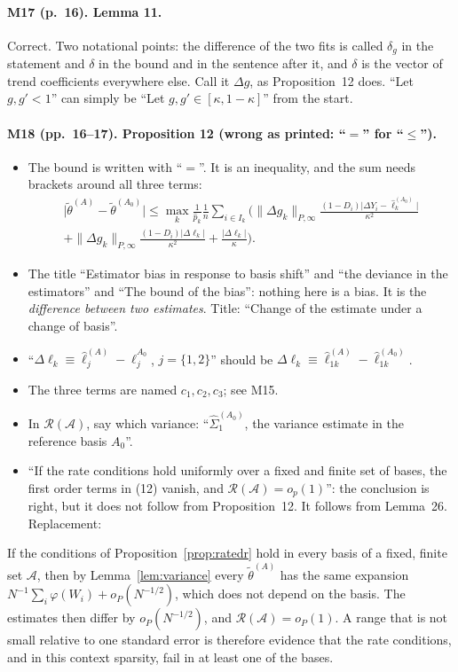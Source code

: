 \documentclass[11pt]{article}
\newenvironment{ins}{\begin{leftbar}}{\end{leftbar}}
\theoremstyle{plain}
\theoremstyle{remark}
\begin{document}
\paragraph{M17 (p.~16). Lemma 11.} Correct. Two notational points: the
difference of the two fits is called $\delta_g$ in the statement and $\delta$ in
the bound and in the sentence after it, and $\delta$ is the vector of trend
coefficients everywhere else. Call it $\Delta g$, as Proposition~12 does. ``Let
$g,g'<1$'' can simply be ``Let $g,g'\in[\kappa,1-\kappa]$'' from the start.

\paragraph{M18 (pp.~16--17). Proposition 12 (wrong as printed: ``$=$'' for ``$\le$'').}
\begin{itemize}
\item The bound is written with ``$=$''. It is an inequality, and the sum needs
  brackets around all three terms:
  \begin{multline*}
  \big|\tilde\theta^{(A)}-\tilde\theta^{(A_0)}\big|\le\max_k\frac1{\hat p_k}\frac1n\sum_{i\in I_k}
  \bigg(\|\Delta g_k\|_{P,\infty}\frac{(1-D_i)\big|\Delta Y_i-\hat\ell_k^{(A_0)}\big|}{\kappa^2}\\
  +\|\Delta g_k\|_{P,\infty}\frac{(1-D_i)|\Delta\ell_k|}{\kappa^2}+\frac{|\Delta\ell_k|}{\kappa}\bigg).
  \end{multline*}
\item The title ``Estimator bias in response to basis shift'' and ``the
  deviance in the estimators'' and ``The bound of the bias'': nothing here is a
  bias. It is the \emph{difference between two estimates}. Title: ``Change of the
  estimate under a change of basis''.
\item ``$\Delta\ell_k\equiv\hat\ell_j^{(A)}-\hat\ell_j^{A_0}$, $j=\{1,2\}$'' should
  be $\Delta\ell_k\equiv\hat\ell_{1k}^{(A)}-\hat\ell_{1k}^{(A_0)}$.
\item The three terms are named $c_1,c_2,c_3$; see M15.
\item In $\mathcal R(\mathcal A)$, say which variance: ``$\hat\Sigma_1^{(A_0)}$,
  the variance estimate in the reference basis $A_0$''.
\item ``If the rate conditions hold uniformly over a fixed and finite set of
  bases, the first order terms in (12) vanish, and
  $\mathcal R(\mathcal A)=o_p(1)$'': the conclusion is right, but it does not
  follow from Proposition~12. It follows from Lemma~26. Replacement:
\end{itemize}
\begin{ins}
If the conditions of Proposition~\ref{prop:ratedr} hold in every basis of a
fixed, finite set $\mathcal A$, then by Lemma~\ref{lem:variance} every
$\tilde\theta^{(A)}$ has the same expansion
$N^{-1}\sum_i\varphi(W_i)+o_P(N^{-1/2})$, which does not depend on the basis.
The estimates then differ by $o_P(N^{-1/2})$, and
$\mathcal R(\mathcal A)=o_P(1)$. A range that is not small relative to one
standard error is therefore evidence that the rate conditions, and in this
context sparsity, fail in at least one of the bases.
\end{ins}
\end{document}
